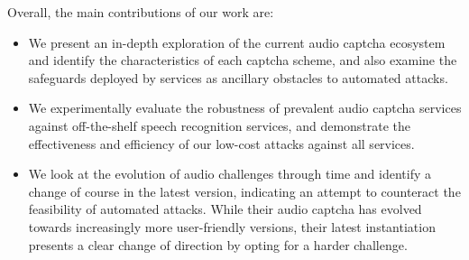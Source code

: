 Overall, the main contributions of our work are:

\begin{itemize}

\item We present an in-depth exploration of the current audio captcha ecosystem and identify the characteristics 
of each captcha scheme, and also examine the safeguards deployed by services as ancillary obstacles to automated
attacks.

\item We experimentally evaluate the robustness of prevalent audio captcha services against
off-the-shelf speech recognition services, and demonstrate the effectiveness and efficiency 
of our low-cost attacks against all services.

\item We look at the evolution of \re audio challenges through time
 and identify a change of course in the latest version, indicating 
 an attempt to counteract the feasibility of automated attacks. While 
 their audio captcha has evolved towards increasingly more user-friendly versions,
 their latest instantiation presents a clear change of direction by 
 opting for a harder challenge.


\end{itemize}
